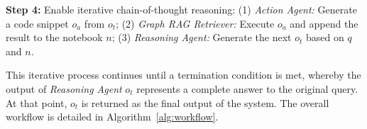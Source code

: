 \noindent \textbf{Step 4:} Enable iterative chain-of-thought reasoning: (1) \textit{Action Agent:} Generate a code snippet $o_a$ from $o_t$; (2) \textit{Graph RAG Retriever:} Execute $o_a$ and append the result to the notebook $n$; (3) \textit{Reasoning Agent:} Generate the next $o_t$ based on $q$ and $n$.


This iterative process continues until a termination condition is met, whereby the output of \textit{Reasoning Agent} $o_t$ represents a complete answer to the original query. At that point, $o_t$ is returned as the final output of the system. The overall workflow is detailed in Algorithm~\ref{alg:workflow}.





